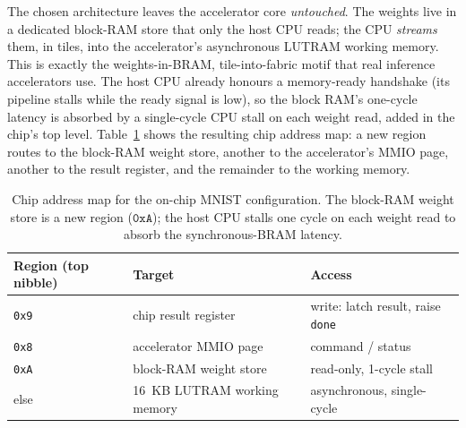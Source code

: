 \documentclass[12pt,a4paper,oneside]{report}
\newcommand{\code}[1]{\texttt{#1}}
\begin{document}
The chosen architecture leaves the accelerator core \emph{untouched}. The weights
live in a dedicated block-RAM store that only the host CPU reads; the CPU
\emph{streams} them, in tiles, into the accelerator's asynchronous LUTRAM working
memory. This is exactly the weights-in-BRAM, tile-into-fabric motif that real
inference accelerators use. The host CPU already honours a memory-ready handshake
(its pipeline stalls while the ready signal is low), so the block RAM's one-cycle
latency is absorbed by a single-cycle CPU stall on each weight read, added in the
chip's top level. Table~\ref{tab:chipmap} shows the resulting chip address map: a
new region routes to the block-RAM weight store, another to the accelerator's MMIO
page, another to the result register, and the remainder to the working memory.

\begin{table}[t]
\caption{Chip address map for the on-chip MNIST configuration. The block-RAM
weight store is a new region ($\mathtt{0xA}$); the host CPU stalls one cycle on
each weight read to absorb the synchronous-BRAM latency.}
\label{tab:chipmap}
\centering
\small
\begin{tabular}{lll}
\toprule
Region (top nibble) & Target & Access\\
\midrule
\code{0x9} & chip result register & write: latch result, raise \code{done}\\
\code{0x8} & accelerator MMIO page & command / status\\
\code{0xA} & block-RAM weight store & read-only, 1-cycle stall\\
else       & 16~KB LUTRAM working memory & asynchronous, single-cycle\\
\bottomrule
\end{tabular}
\end{table}
\end{document}
